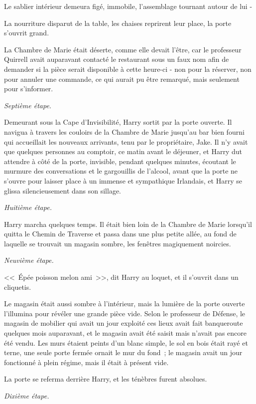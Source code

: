 Le sablier intérieur demeura figé, immobile, l'assemblage tournant autour de lui -

La nourriture disparut de la table, les chaises reprirent leur place, la porte s'ouvrit grand.

La Chambre de Marie était déserte, comme elle devait l'être, car le professeur Quirrell avait auparavant contacté le restaurant sous un faux nom afin de demander si la pièce serait disponible à cette heure-ci - non pour la réserver, non pour annuler une commande, ce qui aurait pu être remarqué, mais seulement pour s'informer.

\emph{Septième étape.}

Demeurant sous la Cape d'Invisibilité, Harry sortit par la porte ouverte. Il navigua à travers les couloirs de la Chambre de Marie jusqu'au bar bien fourni qui accueillait les nouveaux arrivants, tenu par le propriétaire, Jake. Il n'y avait que quelques personnes au comptoir, ce matin avant le déjeuner, et Harry dut attendre à côté de la porte, invisible, pendant quelques minutes, écoutant le murmure des conversations et le gargouillis de l'alcool, avant que la porte ne s'ouvre pour laisser place à un immense et sympathique Irlandais, et Harry se glissa silencieusement dans son sillage.

\emph{Huitième étape.}

Harry marcha quelques temps. Il était bien loin de la Chambre de Marie lorsqu'il quitta le Chemin de Traverse et passa dans une plus petite allée, au fond de laquelle se trouvait un magasin sombre, les fenêtres magiquement noircies.

\emph{Neuvième étape.}

<<~Épée poisson melon ami~>>, dit Harry au loquet, et il s'ouvrit dans un cliquetis.

Le magasin était aussi sombre à l'intérieur, mais la lumière de la porte ouverte l'illumina pour révéler une grande pièce vide. Selon le professeur de Défense, le magasin de mobilier qui avait un jour exploité ces lieux avait fait banqueroute quelques mois auparavant, et le magasin avait été saisit mais n'avait pas encore été vendu. Les murs étaient peints d'un blanc simple, le sol en bois était rayé et terne, une seule porte fermée ornait le mur du fond~; le magasin avait un jour fonctionné à plein régime, mais il était à présent vide.

La porte se referma derrière Harry, et les ténèbres furent absolues.

\emph{Dixième étape.}

